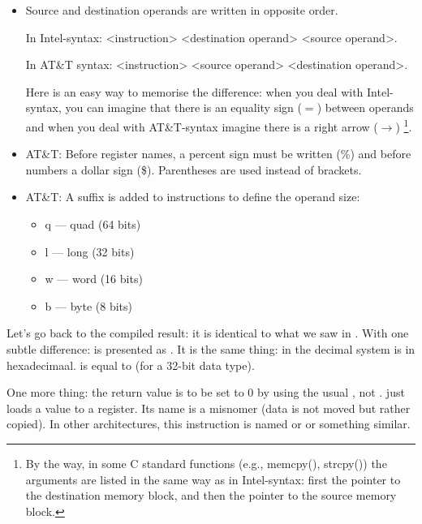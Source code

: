 \begin{itemize}

\item
Source and destination operands are written in opposite order.

In Intel-syntax: <instruction> <destination operand> <source operand>.

In AT\&T syntax: <instruction> <source operand> <destination operand>.

Here is an easy way to memorise the difference:
when you deal with Intel-syntax, you can imagine that there is an equality sign ($=$) between operands
and when you deal with AT\&T-syntax imagine there is a right arrow ($\rightarrow$)
\footnote{By the way, in some C standard functions (e.g., memcpy(), strcpy()) the arguments
are listed in the same way as in Intel-syntax: first the pointer to the destination memory block, and then
the pointer to the source memory block.}.

\item
AT\&T: Before register names, a percent sign must be written (\%) and before numbers a dollar sign (\$).
Parentheses are used instead of brackets.

\item
AT\&T: A suffix is added to instructions to define the operand size:

\begin{itemize}
\item q --- quad (64 bits)
\item l --- long (32 bits)
\item w --- word (16 bits)
\item b --- byte (8 bits)
\end{itemize}


\end{itemize}

Let's go back to the compiled result: it is identical to what we saw in \IDA.
With one subtle difference:  is presented as .
It is the same thing:  in the decimal system is  in hexadecimaal.
 is equal to  (for a 32-bit data type).

One more thing: the return value is to be set to 0 by using the usual \MOV, not \XOR.
\MOV just loads a value to a register.
Its name is a misnomer (data is not moved but rather copied). In other architectures, this instruction is named  or  or something similar.

